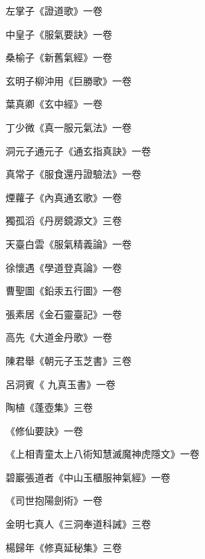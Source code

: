\begin{pinyinscope}
 左掌子《證道歌》一卷



 中皇子《服氣要訣》一卷



 桑榆子《新舊氣經》一卷



 玄明子柳沖用《巨勝歌》一卷



 葉真卿《玄中經》一卷



 丁少微《真一服元氣法》一卷



 洞元子通元子《通玄指真訣》一卷



 真常子《服食還丹證驗法》一卷



 煙蘿子《內真通玄歌》一卷



 獨孤滔《丹房鏡源文》三卷



 天臺白雲《服氣精義論》一卷



 徐懷遇《學道登真論》一卷



 曹聖圖《鉛汞五行圖》一卷



 張素居《金石靈臺記》一卷



 高先《大道金丹歌》一卷



 陳君舉《朝元子玉芝書》三卷



 呂洞賓《
 九真玉書》一卷



 陶植《蓬壺集》三卷


《修仙要訣》一卷



 《上相青童太上八術知慧滅魔神虎隱文》一卷



 碧巖張道者《中山玉櫃服神氣經》一卷



 《司世抱陽劍術》一卷



 金明七真人《三洞奉道科誡》三卷



 楊歸年《修真延秘集》三卷




\end{pinyinscope}
